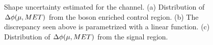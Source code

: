 \begin{figure}[htbp]
{  }
  \caption{Shape uncertainty estimated for the \Hmuhad channel. (a) Distribution of $\Delta\phi(\mu, MET)$ from the \PW boson enriched control region. (b) The discrepancy seen above is parametrized with a linear function. (c) Distribution of $\Delta\phi(\mu, MET)$ from the signal region.}
  \label{fig:mutauh_systematics}
\end{figure}

